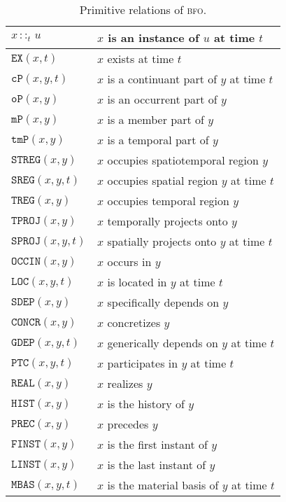 \documentclass[ao]{iosart2x}
\newcommand{\pr}[1]{\mathtt{#1}}
\newcommand{\bfo}{{\textsc{bfo}}}
\newcommand{\bfocpart}{\pr{cP}}
\newcommand{\bfoopart}{\pr{oP}}
\newcommand{\bfotpart}{\pr{tmP}}
\newcommand{\bfompart}{\pr{mP}}
\newcommand{\bfoexist}{\pr{EX}}
\newcommand{\bfoiof}[1]{{\,::_{#1\:\!}}}
\newcommand{\bfosdep}{\pr{SDEP}}
\newcommand{\bfogdep}{\pr{GDEP}}
\newcommand{\bfooccurs}{\pr{OCCIN}}
\newcommand{\bfolocated}{\pr{LOC}}
\newcommand{\bfosregof}{\pr{SREG}}
\newcommand{\bfotregof}{\pr{TREG}}
\newcommand{\bfostregof}{\pr{STREG}}
\newcommand{\bfoparticin}{\pr{PTC}}
\newcommand{\bfoconcr}{\pr{CONCR}}
\newcommand{\bforealizes}{\pr{REAL}}
\newcommand{\bfotproj}{\pr{TPROJ}}
\newcommand{\bfosproj}{\pr{SPROJ}}
\newcommand{\bfohistory}{\pr{HIST}}
\begin{document}
\begin{table*}
\caption{Primitive relations of {\bfo}.}\label{table_prim_bfo}
\begin{tabular}{|l|l|}
\hline
$x \bfoiof{t} u$ & $x$ is an instance of $u$ at time $t$ \\
\hline
$\bfoexist(x,t)$ & $x$ exists at time $t$ \\
\hline
$\bfocpart(x,y,t)$ & $x$ is a continuant part of $y$ at time $t$ \\
\hline
$\bfoopart(x,y)$ & $x$ is an occurrent part of $y$\\
\hline
$\bfompart(x,y)$ & $x$ is a member part of $y$\\
\hline
$\bfotpart(x,y)$ & $x$ is a temporal part of $y$ \\
\hline
$\bfostregof(x,y)$ & $x$ occupies spatiotemporal region $y$\\
\hline
$\bfosregof(x,y,t)$ & $x$ occupies spatial region $y$ at time $t$ \\
\hline
$\bfotregof(x,y)$ & $x$ occupies temporal region $y$\\
\hline
$\bfotproj(x,y)$ & $x$ temporally projects onto $y$\\
\hline
$\bfosproj(x,y,t)$ & $x$ spatially projects onto $y$ at time $t$\\
\hline
$\bfooccurs(x,y)$ & $x$ occurs in $y$\\
\hline
$\bfolocated(x,y,t)$ & $x$ is located in $y$ at time $t$\\
\hline
$\bfosdep(x,y)$ & $x$ specifically depends on $y$\\
\hline
$\bfoconcr(x,y)$ & $x$ concretizes $y$\\
\hline
$\bfogdep(x,y,t)$ & $x$ generically depends on $y$ at time $t$\\
\hline
$\bfoparticin(x,y,t)$ & $x$ participates in $y$ at time $t$\\
\hline
$\bforealizes(x,y)$ & $x$ realizes $y$\\
\hline
$\bfohistory(x,y)$ & $x$ is the history of $y$\\
\hline
$\pr{PREC}(x,y)$ & $x$ precedes $y$\\
\hline
$\pr{FINST}(x,y)$ & $x$ is the first instant of $y$\\
\hline
$\pr{LINST}(x,y)$ & $x$ is the last instant of $y$\\
\hline
$\pr{MBAS}(x,y,t)$ & $x$ is the material basis of $y$ at time $t$\\
\hline
\end{tabular}
\end{table*}
\end{document}
